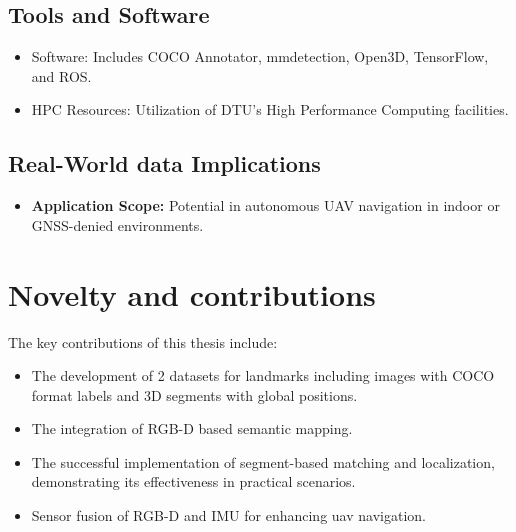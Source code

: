 \subsection{Tools and Software}
\begin{itemize}
\item Software: Includes COCO Annotator, mmdetection, Open3D, TensorFlow, and ROS.
\item HPC Resources: Utilization of DTU's High Performance Computing facilities.
\end{itemize}

\subsection{Real-World data Implications}
\begin{itemize}
\item \textbf{Application Scope:} Potential in autonomous UAV navigation in indoor or GNSS-denied environments.
\end{itemize}

\section{Novelty and contributions}
The key contributions of this thesis include:
\begin{itemize}
    \item The development of 2 datasets for landmarks including images with COCO format\cite{mscoco} labels and 3D segments with global positions.
    \item The integration of RGB-D based semantic mapping.
    \item The successful implementation of segment-based matching and localization, demonstrating its effectiveness in practical scenarios.
    \item Sensor fusion of RGB-D and IMU for enhancing \acrshort{uav} navigation.
\end{itemize}









